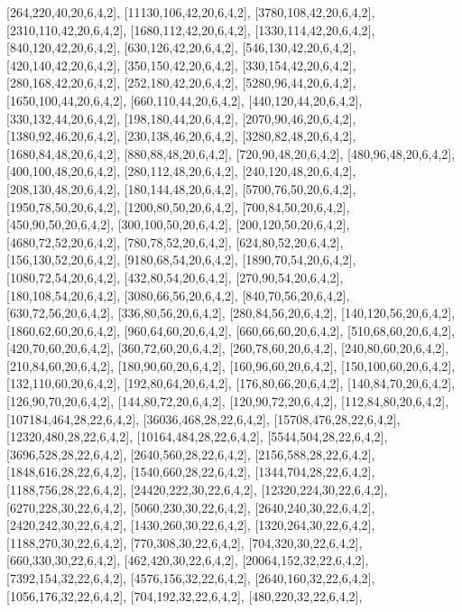\documentclass[12pt]{amsart}
\begin{document}
[264,220,40,20,6,4,2],   [11130,106,42,20,6,4,2],   [3780,108,42,20,6,4,2],   [2310,110,42,20,6,4,2],   [1680,112,42,20,6,4,2],   [1330,114,42,20,6,4,2],
[840,120,42,20,6,4,2],   [630,126,42,20,6,4,2],   [546,130,42,20,6,4,2],   [420,140,42,20,6,4,2],   [350,150,42,20,6,4,2],   [330,154,42,20,6,4,2],
[280,168,42,20,6,4,2],   [252,180,42,20,6,4,2],   [5280,96,44,20,6,4,2],   [1650,100,44,20,6,4,2],   [660,110,44,20,6,4,2],   [440,120,44,20,6,4,2],
[330,132,44,20,6,4,2],   [198,180,44,20,6,4,2],   [2070,90,46,20,6,4,2],   [1380,92,46,20,6,4,2],   [230,138,46,20,6,4,2],   [3280,82,48,20,6,4,2],
[1680,84,48,20,6,4,2],   [880,88,48,20,6,4,2],   [720,90,48,20,6,4,2],   [480,96,48,20,6,4,2],   [400,100,48,20,6,4,2],   [280,112,48,20,6,4,2],   [240,120,48,20,6,4,2],
[208,130,48,20,6,4,2],   [180,144,48,20,6,4,2],   [5700,76,50,20,6,4,2],   [1950,78,50,20,6,4,2],   [1200,80,50,20,6,4,2],   [700,84,50,20,6,4,2],   [450,90,50,20,6,4,2],
[300,100,50,20,6,4,2],   [200,120,50,20,6,4,2],   [4680,72,52,20,6,4,2],   [780,78,52,20,6,4,2],   [624,80,52,20,6,4,2],   [156,130,52,20,6,4,2],   [9180,68,54,20,6,4,2],
[1890,70,54,20,6,4,2],   [1080,72,54,20,6,4,2],   [432,80,54,20,6,4,2],   [270,90,54,20,6,4,2],   [180,108,54,20,6,4,2],   [3080,66,56,20,6,4,2],   [840,70,56,20,6,4,2],
[630,72,56,20,6,4,2],   [336,80,56,20,6,4,2],   [280,84,56,20,6,4,2],   [140,120,56,20,6,4,2],   [1860,62,60,20,6,4,2],   [960,64,60,20,6,4,2],   [660,66,60,20,6,4,2],
[510,68,60,20,6,4,2],   [420,70,60,20,6,4,2],   [360,72,60,20,6,4,2],   [260,78,60,20,6,4,2],   [240,80,60,20,6,4,2],   [210,84,60,20,6,4,2],   [180,90,60,20,6,4,2],
[160,96,60,20,6,4,2],   [150,100,60,20,6,4,2],   [132,110,60,20,6,4,2],   [192,80,64,20,6,4,2],   [176,80,66,20,6,4,2],   [140,84,70,20,6,4,2],   [126,90,70,20,6,4,2],
[144,80,72,20,6,4,2],   [120,90,72,20,6,4,2],   [112,84,80,20,6,4,2],   [107184,464,28,22,6,4,2],   [36036,468,28,22,6,4,2],   [15708,476,28,22,6,4,2],
[12320,480,28,22,6,4,2],   [10164,484,28,22,6,4,2],   [5544,504,28,22,6,4,2],   [3696,528,28,22,6,4,2],   [2640,560,28,22,6,4,2],   [2156,588,28,22,6,4,2],
[1848,616,28,22,6,4,2],   [1540,660,28,22,6,4,2],   [1344,704,28,22,6,4,2],   [1188,756,28,22,6,4,2],   [24420,222,30,22,6,4,2],   [12320,224,30,22,6,4,2],
[6270,228,30,22,6,4,2],   [5060,230,30,22,6,4,2],   [2640,240,30,22,6,4,2],   [2420,242,30,22,6,4,2],   [1430,260,30,22,6,4,2],   [1320,264,30,22,6,4,2],
[1188,270,30,22,6,4,2],   [770,308,30,22,6,4,2],   [704,320,30,22,6,4,2],   [660,330,30,22,6,4,2],   [462,420,30,22,6,4,2],   [20064,152,32,22,6,4,2],
[7392,154,32,22,6,4,2],   [4576,156,32,22,6,4,2],   [2640,160,32,22,6,4,2],   [1056,176,32,22,6,4,2],   [704,192,32,22,6,4,2],   [480,220,32,22,6,4,2],
\end{document}

